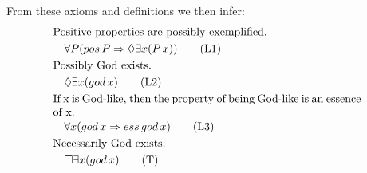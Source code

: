 \documentclass{llncs}
\begin{document}


\noindent
From these axioms and definitions we then infer:
\begin{align}
& \text{Positive properties are possibly exemplified.} \notag \\
& \quad \forall P (pos\,P \Rightarrow \Diamond \exists x (P\,x)) \tag{L1} \\
& \text{Possibly God exists.} \notag \\
& \quad \Diamond \exists x (god\,x) \tag{L2} \\
& \parbox[c][2em][c]{0.8\textwidth}{If x is God-like, then the property of being God-like is an essence of x.} \notag \\
& \quad \forall x (god\,x \Rightarrow ess\,god\,x) \tag{L3} \\
& \text{Necessarily God exists.} \notag \\
& \quad \Box \exists x (god\,x) \tag{T}
\end{align}


%
\end{document}
